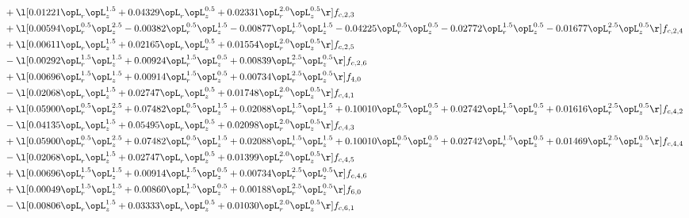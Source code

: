 \begin{alignat}{2}
& + \l[  0.01221 \opL_r \opL_z^{1.5} +  0.04329 \opL_r \opL_z^{0.5} +  0.02331 \opL_r^{2.0} \opL_z^{0.5}  \r] f_{c,2,3} \nonumber \\ 
& + \l[  0.00594 \opL_r^{0.5} \opL_z^{2.5}   -0.00382 \opL_r^{0.5} \opL_z^{1.5}   -0.00877 \opL_r^{1.5} \opL_z^{1.5}   -0.04225 \opL_r^{0.5} \opL_z^{0.5}   -0.02772 \opL_r^{1.5} \opL_z^{0.5}   -0.01677 \opL_r^{2.5} \opL_z^{0.5}  \r] f_{c,2,4} \nonumber \\ 
& + \l[  0.00611 \opL_r \opL_z^{1.5} +  0.02165 \opL_r \opL_z^{0.5} +  0.01554 \opL_r^{2.0} \opL_z^{0.5}  \r] f_{c,2,5} \nonumber \\ 
& - \l[  0.00292 \opL_r^{1.5} \opL_z^{1.5} +  0.00924 \opL_r^{1.5} \opL_z^{0.5} +  0.00839 \opL_r^{2.5} \opL_z^{0.5}  \r] f_{c,2,6} \nonumber \\ 
& + \l[  0.00696 \opL_r^{1.5} \opL_z^{1.5} +  0.00914 \opL_r^{1.5} \opL_z^{0.5} +  0.00734 \opL_r^{2.5} \opL_z^{0.5}  \r] f_{4,0} \nonumber \\ 
& - \l[  0.02068 \opL_r \opL_z^{1.5} +  0.02747 \opL_r \opL_z^{0.5} +  0.01748 \opL_r^{2.0} \opL_z^{0.5}  \r] f_{c,4,1} \nonumber \\ 
& + \l[  0.05900 \opL_r^{0.5} \opL_z^{2.5} +  0.07482 \opL_r^{0.5} \opL_z^{1.5} +  0.02088 \opL_r^{1.5} \opL_z^{1.5} +  0.10010 \opL_r^{0.5} \opL_z^{0.5} +  0.02742 \opL_r^{1.5} \opL_z^{0.5} +  0.01616 \opL_r^{2.5} \opL_z^{0.5}  \r] f_{c,4,2} \nonumber \\ 
& - \l[  0.04135 \opL_r \opL_z^{1.5} +  0.05495 \opL_r \opL_z^{0.5} +  0.02098 \opL_r^{2.0} \opL_z^{0.5}  \r] f_{c,4,3} \nonumber \\ 
& + \l[  0.05900 \opL_r^{0.5} \opL_z^{2.5} +  0.07482 \opL_r^{0.5} \opL_z^{1.5} +  0.02088 \opL_r^{1.5} \opL_z^{1.5} +  0.10010 \opL_r^{0.5} \opL_z^{0.5} +  0.02742 \opL_r^{1.5} \opL_z^{0.5} +  0.01469 \opL_r^{2.5} \opL_z^{0.5}  \r] f_{c,4,4} \nonumber \\ 
& - \l[  0.02068 \opL_r \opL_z^{1.5} +  0.02747 \opL_r \opL_z^{0.5} +  0.01399 \opL_r^{2.0} \opL_z^{0.5}  \r] f_{c,4,5} \nonumber \\ 
& + \l[  0.00696 \opL_r^{1.5} \opL_z^{1.5} +  0.00914 \opL_r^{1.5} \opL_z^{0.5} +  0.00734 \opL_r^{2.5} \opL_z^{0.5}  \r] f_{c,4,6} \nonumber \\ 
& + \l[  0.00049 \opL_r^{1.5} \opL_z^{1.5} +  0.00860 \opL_r^{1.5} \opL_z^{0.5} +  0.00188 \opL_r^{2.5} \opL_z^{0.5}  \r] f_{6,0} \nonumber \\ 
& - \l[  0.00806 \opL_r \opL_z^{1.5} +  0.03333 \opL_r \opL_z^{0.5} +  0.01030 \opL_r^{2.0} \opL_z^{0.5}  \r] f_{c,6,1} \nonumber \\ 

\end{alignat}
